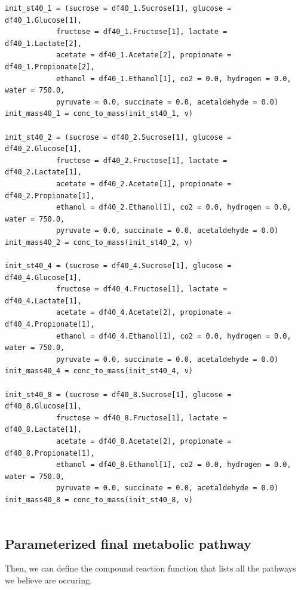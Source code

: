 \documentclass[11pt]{article}
\begin{document}
\begin{verbatim}
init_st40_1 = (sucrose = df40_1.Sucrose[1], glucose = df40_1.Glucose[1],
            fructose = df40_1.Fructose[1], lactate = df40_1.Lactate[2],
            acetate = df40_1.Acetate[2], propionate = df40_1.Propionate[2],
            ethanol = df40_1.Ethanol[1], co2 = 0.0, hydrogen = 0.0, water = 750.0,
            pyruvate = 0.0, succinate = 0.0, acetaldehyde = 0.0)
init_mass40_1 = conc_to_mass(init_st40_1, v)

init_st40_2 = (sucrose = df40_2.Sucrose[1], glucose = df40_2.Glucose[1],
            fructose = df40_2.Fructose[1], lactate = df40_2.Lactate[1],
            acetate = df40_2.Acetate[1], propionate = df40_2.Propionate[1],
            ethanol = df40_2.Ethanol[1], co2 = 0.0, hydrogen = 0.0, water = 750.0,
            pyruvate = 0.0, succinate = 0.0, acetaldehyde = 0.0)
init_mass40_2 = conc_to_mass(init_st40_2, v)

init_st40_4 = (sucrose = df40_4.Sucrose[1], glucose = df40_4.Glucose[1],
            fructose = df40_4.Fructose[1], lactate = df40_4.Lactate[1],
            acetate = df40_4.Acetate[2], propionate = df40_4.Propionate[1],
            ethanol = df40_4.Ethanol[1], co2 = 0.0, hydrogen = 0.0, water = 750.0,
            pyruvate = 0.0, succinate = 0.0, acetaldehyde = 0.0)
init_mass40_4 = conc_to_mass(init_st40_4, v)

init_st40_8 = (sucrose = df40_8.Sucrose[1], glucose = df40_8.Glucose[1],
            fructose = df40_8.Fructose[1], lactate = df40_8.Lactate[1],
            acetate = df40_8.Acetate[2], propionate = df40_8.Propionate[1],
            ethanol = df40_8.Ethanol[1], co2 = 0.0, hydrogen = 0.0, water = 750.0,
            pyruvate = 0.0, succinate = 0.0, acetaldehyde = 0.0)
init_mass40_8 = conc_to_mass(init_st40_8, v)


\end{verbatim}

\subsection{Parameterized final metabolic pathway}
\label{sec:org081f399}
Then, we can define the compound reaction function that lists all the pathways we believe are occuring.
\end{document}
